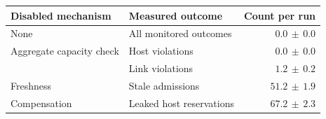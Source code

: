 {\footnotesize\setlength{\tabcolsep}{2pt}%
\begin{tabularx}{\columnwidth}{@{}>{\raggedright\arraybackslash}p{}>{\raggedright\arraybackslash}Xr@{}}
\toprule
Disabled mechanism & Measured outcome & Count per run \\
\midrule
None & All monitored outcomes & $0.0\,\pm\,0.0$ \\
Aggregate capacity check & Host violations & $0.0\,\pm\,0.0$ \\
 & Link violations & $1.2\,\pm\,0.2$ \\
Freshness & Stale admissions & $51.2\,\pm\,1.9$ \\
Compensation & Leaked host reservations & $67.2\,\pm\,2.3$ \\
\bottomrule
\end{tabularx}}%
